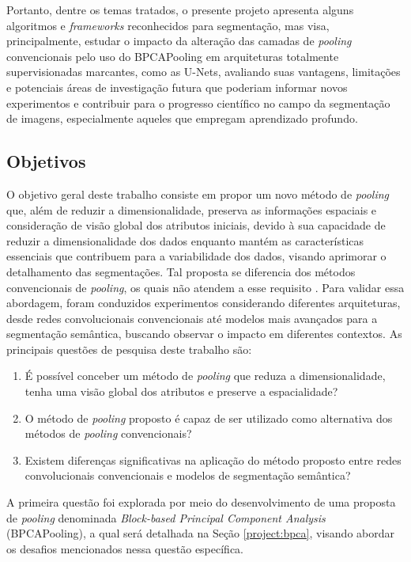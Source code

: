 Portanto, dentre os temas tratados, o presente projeto apresenta alguns algoritmos e \textit{frameworks} reconhecidos para segmentação, mas visa, principalmente, estudar o impacto da alteração das camadas de \textit{pooling} convencionais pelo uso do BPCAPooling em arquiteturas totalmente supervisionadas marcantes, como as U-Nets, avaliando suas vantagens, limitações e potenciais áreas de investigação futura que poderiam informar novos experimentos e contribuir para o progresso científico no campo da segmentação de imagens, especialmente aqueles que empregam aprendizado profundo.

\subsection{Objetivos}
\label{intro:objectives}
O objetivo geral deste trabalho consiste em propor um novo método de \textit{pooling} que, além de reduzir a dimensionalidade, preserva as informações espaciais e consideração de visão global dos atributos iniciais, devido à sua capacidade de reduzir a dimensionalidade dos dados enquanto mantém as características essenciais que contribuem para a variabilidade dos dados, visando aprimorar o detalhamento das segmentações. Tal proposta se diferencia dos métodos convencionais de \textit{pooling}, os quais não atendem a esse requisito \citep{Liu2019Multi-LevelNetworks}. Para validar essa abordagem, foram conduzidos experimentos considerando diferentes arquiteturas, desde redes convolucionais convencionais até modelos mais avançados para a segmentação semântica, buscando observar o impacto em diferentes contextos. As principais questões de pesquisa deste trabalho são:

\begin{enumerate}
    \item É possível conceber um método de \textit{pooling} que reduza a dimensionalidade, tenha uma visão global dos atributos e preserve a espacialidade?
    \item O método de \textit{pooling} proposto é capaz de ser utilizado como alternativa dos métodos de \textit{pooling} convencionais?
    \item Existem diferenças significativas na aplicação do método proposto entre redes convolucionais convencionais e modelos de segmentação semântica?
\end{enumerate}

A primeira questão foi explorada por meio do desenvolvimento de uma proposta de \textit{pooling} denominada \textit{Block-based Principal Component Analysis} (BPCAPooling), a qual será detalhada na Seção \ref{project:bpca}, visando abordar os desafios mencionados nessa questão específica.

